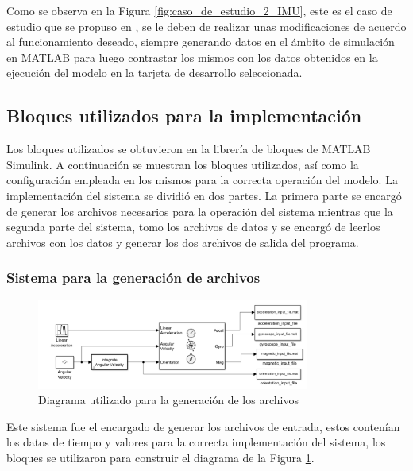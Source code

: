 Como se observa en la Figura \ref{fig:caso_de_estudio_2_IMU}, este es el caso de estudio que se propuso en \cite{mathworks2024imu}, se le deben de realizar unas modificaciones de acuerdo al funcionamiento deseado, siempre generando datos en el ámbito de simulación en MATLAB para luego contrastar los mismos con los datos obtenidos en la ejecución del modelo en la tarjeta de desarrollo seleccionada.

\subsection{Bloques utilizados para la implementación}

Los bloques utilizados se obtuvieron en la librería de bloques de MATLAB Simulink. A continuación se muestran los bloques utilizados, así como la configuración empleada en los mismos para la correcta operación del modelo. La implementación del sistema se dividió en dos partes. La primera parte se encargó de generar los archivos necesarios para la operación del sistema mientras que la segunda parte del sistema, tomo los archivos de datos y se encargó de leerlos archivos con los datos y generar los dos archivos de salida del programa.

\subsubsection{Sistema para la generación de archivos}\label{subsub:generación_de_archivos}

\begin{figure}[h!]
    \centering
    \includegraphics[width=0.8\textwidth]{fig/Capitulo5/Caso_de_estudio_IMU/Generador_de_archivos/flujo_generador_de_archivos.pdf}
    \caption{Diagrama utilizado para la generación de los archivos \cite{mathworks2024imu}}
    \label{fig:caso_de_estudio_2_IMU_generación_de_archivos}
\end{figure}

Este sistema fue el encargado de generar los archivos de entrada, estos contenían los datos de tiempo y valores para la correcta implementación del sistema, los bloques se utilizaron para construir el diagrama de la Figura \ref{fig:caso_de_estudio_2_IMU_generación_de_archivos}.

